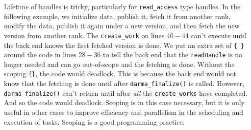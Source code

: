Lifetime of handles is tricky, particularly for \texttt{read\_access} type handles.  
In the following example, we initialize data, publish it, fetch it from another rank, 
modify the data, publish it again under a new version, and then fetch the new version from another rank. 
The \texttt{create\_work} on lines $40-44$ can't execute until the back end knows the first fetched version is done.
We put an extra set of \texttt{\{ \}} around the code in lines $28-36$ to tell the back end that 
the \texttt{readHandle} is no longer needed and can go out-of-scope and the fetching is done.  
Without the scoping \texttt{\{\}}, the code would deadlock. This is because the back end would not know that 
the fetching is done until after \texttt{darma\_finalize()} is called. However, \texttt{darma\_finalize()} 
can't return until after {\it all} the \texttt{create\_works} have completed.  And so the code would deadlock. 
Scoping is in this case necessary, but it is only useful in other cases to improve efficiency and parallelism 
in the scheduling and execution of tasks. Scoping is a good programming practice.


